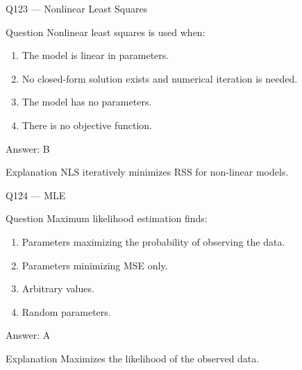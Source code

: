 \documentclass[aspectratio=169,8pt]{beamer}
\begin{document}
\begin{frame}{Q123 --- Nonlinear Least Squares}
\begin{block}{Question}
Nonlinear least squares is used when:
\end{block}
\begin{enumerate}
\item The model is linear in parameters.
\item No closed-form solution exists and numerical iteration is needed.
\item The model has no parameters.
\item There is no objective function.
\end{enumerate}

\begin{exampleblock}{Answer: B}\end{exampleblock}
\begin{block}{Explanation}
NLS iteratively minimizes RSS for non-linear models.
\end{block}
\end{frame}

\begin{frame}{Q124 --- MLE}
\begin{block}{Question}
Maximum likelihood estimation finds:
\end{block}
\begin{enumerate}
\item Parameters maximizing the probability of observing the data.
\item Parameters minimizing MSE only.
\item Arbitrary values.
\item Random parameters.
\end{enumerate}

\begin{exampleblock}{Answer: A}\end{exampleblock}
\begin{block}{Explanation}
Maximizes the likelihood of the observed data.
\end{block}
\end{frame}

\end{document}

